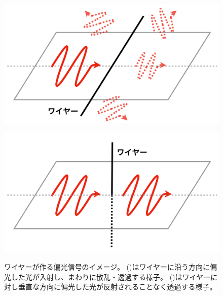 \documentclass[../../main.tex]{subfiles}
\begin{document}
\begin{figure}[H]
    \begin{minipage}[b]{0.48\columnwidth}
        \centering
        \includegraphics[width=\columnwidth]{wiregrid/wire_reflect.pdf}
        \subcaption{}
        \label{fig:wire_reflect}
    \end{minipage}
    \hspace{0.02\columnwidth}
    \begin{minipage}[b]{0.48\columnwidth}
        \centering
        \includegraphics[width=\columnwidth]{wiregrid/wire_through.pdf}
        \subcaption{}
        \label{fig:wire_through}
    \end{minipage}
    \centering
    \caption{ワイヤーが作る偏光信号のイメージ。
             ()はワイヤーに沿う方向に偏光した光が入射し、まわりに散乱・透過する様子。
             ()はワイヤーに対し垂直な方向に偏光した光が反射されることなく透過する様子。
             }
    \label{fig:wire_polarization}
\end{figure}
\end{document}
